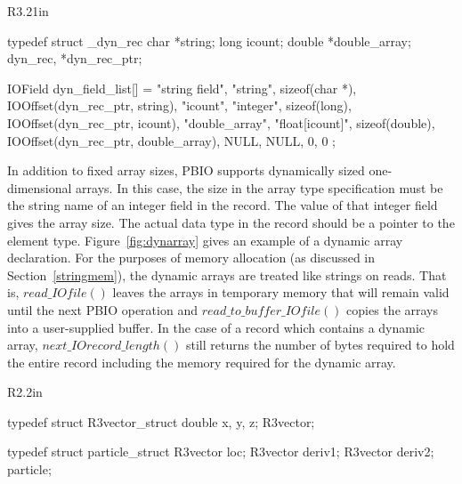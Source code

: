 \documentclass{article}
\begin{document}
\begin{wrapfigure}[17]{R}{3.21in}
\begin{boxedverbatim}
typedef struct _dyn_rec {
    char        *string;
    long        icount;
    double      *double_array;
} dyn_rec, *dyn_rec_ptr;

IOField dyn_field_list[] = {
    {"string field", "string", sizeof(char *), 
      IOOffset(dyn_rec_ptr, string)},
    {"icount", "integer", sizeof(long), 
      IOOffset(dyn_rec_ptr, icount)},
    {"double_array", "float[icount]", sizeof(double), 
      IOOffset(dyn_rec_ptr, double_array)},
    { NULL, NULL, 0, 0}
};
\end{boxedverbatim}
\caption{A dynamic array record format\label{fig:dynarray}}
\end{wrapfigure}
In addition to fixed array sizes, PBIO supports dynamically sized
one-dimensional arrays.  In this case, the size in the array type
specification must be the string name of an integer field in the record.  The
value of that integer field gives the array size.  The actual data type in the
record should be a pointer to the element type.  Figure~\ref{fig:dynarray}
gives an example of a dynamic array declaration.   For the purposes of memory
allocation (as discussed in Section~\ref{stringmem}), the dynamic arrays are
treated like strings on reads.  That is, $read\_IOfile()$ leaves the arrays in
temporary memory that will remain valid until the next PBIO operation and
$read\_to\_buffer\_IOfile()$ copies the arrays into a user-supplied buffer.
In the case of a record which contains a dynamic array,
$next\_IOrecord\_length()$ still returns the number of bytes required to
hold the entire record including the memory required for the dynamic array.

\begin{wrapfigure}[5]{R}{2.2in}
\vspace*{-0.25in}
\begin{boxedverbatim}
 typedef struct R3vector_struct { 
     double x, y, z;
 } R3vector;

 typedef struct particle_struct { 
     R3vector   loc;
     R3vector   deriv1;
     R3vector   deriv2;
 } particle;
\end{boxedverbatim}
\caption{A nested record format\label{fig:part}}
\end{wrapfigure}
\end{document}
